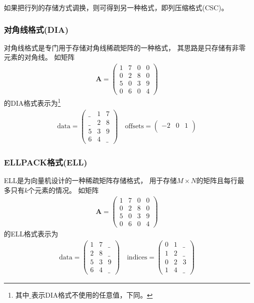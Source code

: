 如果把行列的存储方式调换，则可得到另一种格式，即列压缩格式(CSC)。

\subsubsection{对角线格式(DIA)}
\label{sec:gpu.sparseformat.dia}

对角线格式是专门用于存储对角线稀疏矩阵的一种格式，
其思路是只存储有非零元素的对角线。
如矩阵\cite{bell2008spmv}
\begin{align*}
\bm{A}=\begin{pmatrix}
1 & 7 & 0 & 0\\
0 & 2 & 8 & 0\\
5 & 0 & 3 & 9\\
0 & 6 & 0 & 4
\end{pmatrix}
\end{align*}
的DIA格式表示为\footnote{其中$\_$表示DIA格式不使用的任意值，下同。}
\begin{align*}
\mathrm{data}=\begin{pmatrix}
\_ & 1 & 7\\
\_ & 2 & 8\\
5 & 3 & 9\\
6 & 4 & \_
\end{pmatrix}
\quad
\mathrm{offsets}=\begin{pmatrix}
-2 & 0 & 1\\
\end{pmatrix}
\end{align*}


\subsubsection{ELLPACK格式(ELL)}
ELL是为向量机设计的一种稀疏矩阵存储格式，
用于存储$M\times N$的矩阵且每行最多只有$k$个元素的情况。\cite{grimes1979itpack}
如矩阵\cite{bell2008spmv}
\begin{align*}
\bm{A}=\begin{pmatrix}
1 & 7 & 0 & 0\\
0 & 2 & 8 & 0\\
5 & 0 & 3 & 9\\
0 & 6 & 0 & 4
\end{pmatrix}
\end{align*}
的ELL格式表示为
\begin{align*}
\mathrm{data}=\begin{pmatrix}
1 & 7 & \_\\
2 & 8 & \_\\
5 & 3 & 9 \\
6 & 4 & \_
\end{pmatrix}
\quad
\mathrm{indices}=\begin{pmatrix}
0 & 1 & \_\\
1 & 2 & \_\\
0 & 2 & 3\\
1 & 4 & \_
\end{pmatrix}
\end{align*}

